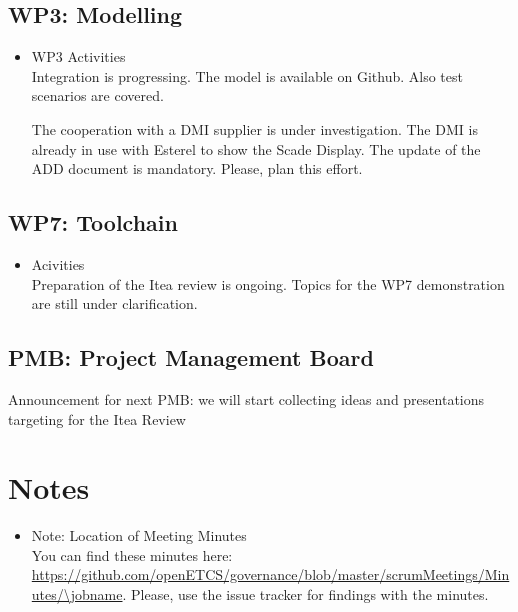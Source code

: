 \documentclass[a4paper, 11pt]{article}
\begin{document}
\subsection{WP3: Modelling}


\begin{itemize}
\item WP3 Activities\\
Integration is progressing. The model is available on Github. Also test scenarios are covered.

The cooperation with a DMI supplier is under investigation. The DMI is already in use with Esterel to show the Scade Display. 
The update of the ADD document is mandatory. Please, plan this effort.

\end{itemize}

\subsection{WP7: Toolchain}

\begin{itemize}
\item Acivities\\
Preparation of the Itea review is ongoing. Topics for the WP7 demonstration are still under clarification.
\end{itemize}

\subsection{PMB: Project Management Board}

Announcement for next PMB: we will start collecting ideas and presentations targeting for the Itea Review

\section{Notes}
\begin{itemize}

\item Note: Location of Meeting Minutes\\
You can find these minutes here: \url{https://github.com/openETCS/governance/blob/master/scrumMeetings/Minutes/\jobname}. Please, use the issue tracker for findings with the minutes.

\end{itemize}
\end{document}
